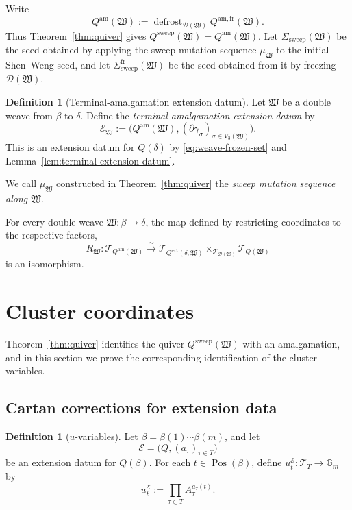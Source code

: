 \documentclass[10pt,a4paper]{article}
\theoremstyle{definition}
\newtheorem{definition}[theorem]{Definition}
\theoremstyle{remark}
\newcommand{\Gm}{\mathbb G_m}
\newcommand{\Tcal}{\mathcal T}
\newcommand{\Dcal}{\mathcal D}
\newcommand{\fW}{\mathfrak W}
\begin{document}
Write
\[
 Q^{\mathrm{am}}(\fW)
 :=\operatorname{defrost}_{\Dcal(\fW)}Q^{\mathrm{am,fr}}(\fW).
\]
Thus Theorem~\ref{thm:quiver} gives
\(Q^{\mathrm{sweep}}(\fW)=Q^{\mathrm{am}}(\fW)\).
Let \(\Sigma_{\mathrm{sweep}}(\fW)\) be the seed obtained by applying the
sweep mutation sequence \(\mu_\fW\) to the initial Shen--Weng seed, and let
\(\Sigma_{\mathrm{sweep}}^{\mathrm{fr}}(\fW)\) be the seed obtained from it by
freezing \(\Dcal(\fW)\).

\begin{definition}[Terminal-amalgamation extension datum]
\label{def:terminal-amalgamation-extension-datum}
Let \(\fW\) be a double weave from \(\beta\) to \(\delta\).  Define the
\emph{terminal-amalgamation extension datum} by
\[
 \mathcal E_\fW
 :=\bigl(Q^{\mathrm{am}}(\fW),
         (\partial\gamma_\sigma)_{\sigma\in V_3(\fW)}\bigr).
\]
This is an extension datum for \(Q(\delta)\) by
\eqref{eq:weave-frozen-set} and
Lemma~\ref{lem:terminal-extension-datum}.
\end{definition}

We call \(\mu_\fW\) constructed in Theorem~\ref{thm:quiver} the
\emph{sweep mutation sequence along \(\fW\)}.

For every double weave \(\fW:\beta\to\delta\), the map defined by restricting
coordinates to the respective factors,
\begin{equation}
 R_\fW:
 \Tcal_{Q^{\mathrm{am}}(\fW)}
 \xrightarrow{\sim}
 \Tcal_{Q^{\mathrm{ext}}(\delta;\fW)}
 \times_{\Tcal_{\Dcal(\fW)}}
 \Tcal_{Q(\fW)}
\label{eq:amalgamation-torus-isomorphism}
\end{equation}
is an isomorphism.

\section{Cluster coordinates}
\label{sec:coordinate-compatibility}

Theorem~\ref{thm:quiver} identifies the quiver \(Q^{\mathrm{sweep}}(\fW)\) with
an amalgamation, and in this section we prove the corresponding identification
of the cluster variables.

\subsection{Cartan corrections for extension data}
\label{sec:cartan-corrections-extension-data}

\begin{definition}[\(u\)-variables]
\label{def:extension-datum-maps}
Let \(\beta=\beta(1)\cdots\beta(m)\), and let
\[
 \mathcal E=\bigl(Q,(a_\tau)_{\tau\in T}\bigr)
\]
be an extension datum for \(Q(\beta)\).  For each
\(t\in\operatorname{Pos}(\beta)\), define
\(u_t^{\mathcal E}:\Tcal_T\to\Gm\) by
\begin{equation}
 u_t^{\mathcal E}:=
 \prod_{\tau\in T}A_\tau^{a_\tau(t)}.
 \label{eq:extension-datum-u-monomial}
\end{equation}
\end{definition}
\end{document}
